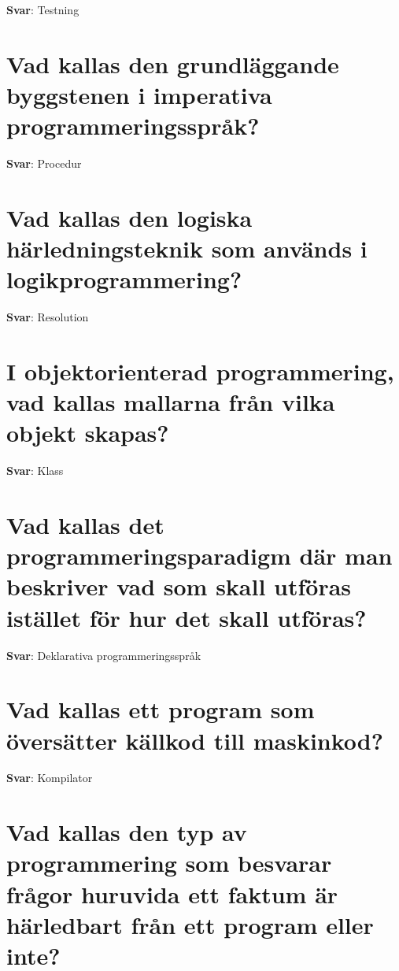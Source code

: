 \documentclass[a4paper,11pt,oneside]{book}
\begin{document}
\begin{sloppypar}
\textbf{Svar}: Testning



\section{Vad kallas den grundl\"aggande byggstenen i imperativa programmeringsspr\r{a}k?}

\label{q:34:sa:sv:True}

\textbf{Svar}: Procedur



\section{Vad kallas den logiska h\"arledningsteknik som anv\"ands i logikprogrammering?}

\label{q:35:sa:sv:True}

\textbf{Svar}: Resolution



\section{I objektorienterad programmering, vad kallas mallarna fr\r{a}n vilka objekt skapas?}

\label{q:36:sa:sv:True}

\textbf{Svar}: Klass



\section{Vad kallas det programmeringsparadigm d\"ar man beskriver vad som skall utf\"oras ist\"allet f\"or hur det skall utf\"oras?}

\label{q:37:sa:sv:True}

\textbf{Svar}: Deklarativa programmeringsspr\r{a}k



\section{Vad kallas ett program som \"overs\"atter k\"allkod till maskinkod?}

\label{q:38:sa:sv:True}

\textbf{Svar}: Kompilator



\section{Vad kallas den typ av programmering som besvarar fr\r{a}gor huruvida ett faktum \"ar h\"arledbart fr\r{a}n ett program eller inte?}


\end{sloppypar}
\end{document}
